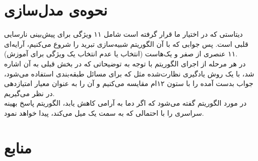 \documentclass{article}
\begin{document}
\begin{multicols}{2}
\section{
نحوه‌ی مدل‌سازی
}
دیتاستی که در اختیار ما قرار گرفته است شامل ۱۱ ویژگی برای پیش‌بینی نارسایی قلبی است. پس جوابی که با آن الگوریتم شبیه‌سازی تبرید را شروع می‌کنیم، آرایه‌ای ۱۱ عنصری از صفر و یک‌هاست
(انتخاب یا عدم انتخاب یک ویژگی برای آموزش).\\
در هر مرحله از اجرای الگوریتم با توجه به توضیحاتی که در بخش قبلی به آن اشاره شد، با یک روش یادگیری نظارت‌شده مثل
که برای مسائل طبقه‌بندی استفاده می‌شود، جواب بدست آمده را با ستون ۱۲ام مقایسه می‌کنیم و آن را به عنوان معیار امتیازدهی در نظر می‌گیریم.\\
در مورد الگوریتم 
گفته می‌شود که اگر دما به آرامی کاهش یابد، الگوریتم پاسخ بهینه سراسری را با احتمالی که به سمت یک میل می‌کند، پیدا خواهد نمود.

\section{
منابع
}
\\

\end{multicols}
\end{document}
